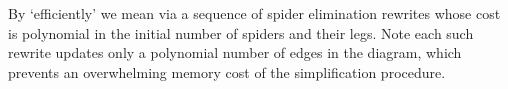 By `efficiently' we mean via a sequence of spider elimination rewrites whose cost is polynomial in the initial number of spiders and their legs. Note each such rewrite updates only a polynomial number of edges in the diagram, which prevents an overwhelming memory cost of the simplification procedure.